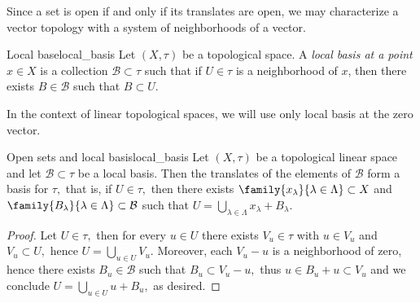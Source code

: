 Since a set is open if and only if its translates are open, we may characterize a vector topology with a system of neighborhoods of a vector.
\begin{definition}{Local base}{local_basis}
    Let \((X,\tau)\) be a topological space. A \emph{local basis at a point \(x \in X\)} is a collection \(\mathcal{B} \subset \tau\) such that if \(U \in \tau\) is a neighborhood of \(x\), then there exists \(B \in \mathcal{B}\) such that \(B \subset U\).
\end{definition}
In the context of linear topological spaces, we will use only local basis at the zero vector.
\begin{proposition}{Open sets and local basis}{local_basis}
    Let \((X, \tau)\) be a topological linear space and let \(\mathcal{B} \subset \tau\) be a local basis. Then the translates of the elements of \(\mathcal{B}\) form a basis for \(\tau,\) that is, if \(U \in \tau,\) then there exists \(\family{x_{\lambda}}{\lambda \in \Lambda} \subset X\) and \(\family{B_\lambda}{\lambda \in \Lambda} \subset \mathcal{B}\) such that \(U = \bigcup_{\lambda \in \Lambda}{x_\lambda + B_\lambda}\).
\end{proposition}
\begin{proof}
    Let \(U\in \tau,\) then for every \(u \in U\) there exists \(V_u \in \tau\) with \(u \in V_u\) and \(V_u \subset U,\) hence \(U = \bigcup_{u \in U} V_u\). Moreover, each \(V_u - u\) is a neighborhood of zero, hence there exists \(B_u \in \mathcal{B}\) such that \(B_u \subset V_u - u,\) thus \(u \in B_u + u \subset V_u\) and we conclude \(U = \bigcup_{u \in U} u + B_u,\) as desired.
\end{proof}

